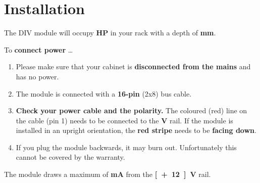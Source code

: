 \documentclass[a4paper,
               11pt,
               parskip=half,
               headinclude,
               titlepage=false]{scrartcl}
\begin{document}
\section*{Installation}

The DIV module will occupy \textbf{\unit[4]{HP}} in your rack with a depth of \textbf{\unit[40]{mm}}.

To \textbf{connect power} …
\begin{enumerate}
 \item Please make sure that your cabinet is \textbf{disconnected from the mains} and has no power.
 \item The module is connected with a \textbf{16-pin} (2x8) bus cable.
 \item \textbf{Check your power cable and the polarity.} The coloured ({\color{red}red}) line on the cable (pin 1) needs to be connected to the \textbf{\unit[-12]{V}} rail.
 If the module is installed in an upright orientation, the \textbf{\color{red}red stripe} needs to be \textbf{facing down}.
 \item If you plug the module backwards, it may burn out.
 Unfortunately this cannot be covered by the warranty.
\end{enumerate}

The module draws a maximum of \textbf{\unit[40]mA} from the \textbf{\unit[+12]{V}} rail.
\end{document}
